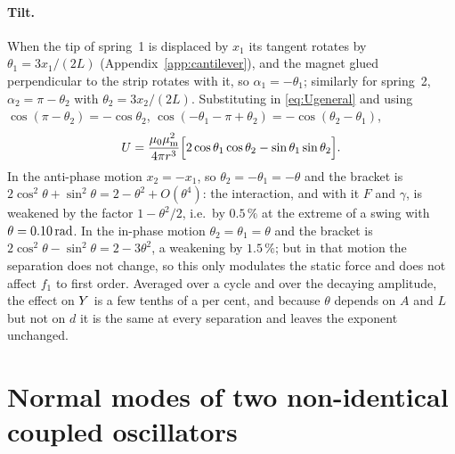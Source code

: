 \paragraph{Tilt.} When the tip of spring~1 is displaced by $x_1$ its tangent rotates by $\theta_1=3x_1/(2L)$ (Appendix~\ref{app:cantilever}), and the magnet glued perpendicular to the strip rotates with it, so $\alpha_1=-\theta_1$; similarly for spring~2, $\alpha_2=\pi-\theta_2$ with $\theta_2=3x_2/(2L)$. Substituting in \eqref{eq:Ugeneral} and using $\cos(\pi-\theta_2)=-\cos\theta_2$, $\cos(-\theta_1-\pi+\theta_2)=-\cos(\theta_2-\theta_1)$,
\begin{equation}
U=\frac{\mu_0\mu_{\mathrm m}^2}{4\pi r^3}\Big[2\cos\theta_1\cos\theta_2-\sin\theta_1\sin\theta_2\Big].
\end{equation}
In the anti-phase motion $x_2=-x_1$, so $\theta_2=-\theta_1=-\theta$ and the bracket is $2\cos^2\theta+\sin^2\theta=2-\theta^2+O(\theta^4)$: the interaction, and with it $F$ and $\gamma$, is weakened by the factor $1-\theta^2/2$, i.e.\ by $0.5\,\%$ at the extreme of a swing with $\theta=0.10\,\mathrm{rad}$. In the in-phase motion $\theta_2=\theta_1=\theta$ and the bracket is $2\cos^2\theta-\sin^2\theta=2-3\theta^2$, a weakening by $1.5\,\%$; but in that motion the separation does not change, so this only modulates the static force and does not affect $f_1$ to first order. Averaged over a cycle and over the decaying amplitude, the effect on $Y$ is a few tenths of a per cent, and because $\theta$ depends on $A$ and $L$ but not on $d$ it is the same at every separation and leaves the exponent unchanged.

\section{Normal modes of two non-identical coupled oscillators}\label{app:detuned}

